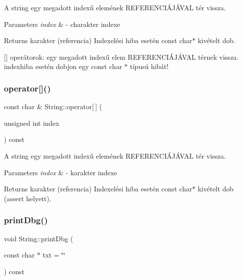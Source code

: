 A string egy megadott indexű elemének R\+E\+F\+E\+R\+E\+N\+C\+IÁ\+JÁ\+V\+AL tér vissza. 
\begin{DoxyParams}{Parameters}
{\em index} & -\/ charakter indexe \\
\hline
\end{DoxyParams}
\begin{DoxyReturn}{Returns}
karakter (referencia) Indexelési hiba esetén const char$\ast$ kivételt dob.
\end{DoxyReturn}
\mbox{[}\mbox{]} operátorok\+: egy megadott indexű elem R\+E\+F\+E\+R\+E\+N\+C\+IÁ\+JÁ\+V\+AL térnek vissza. indexhiba esetén dobjon egy const char $\ast$ típusú hibát! \mbox{\label{class_string_aa21521063bea848db1e3643f64d27887}} 
\subsubsection{\texorpdfstring{operator[]()}{operator[]()}\hspace{0.1cm}{\footnotesize\ttfamily [2/2]}}
{\footnotesize\ttfamily const char \& String\+::operator\mbox{[}$\,$\mbox{]} (\begin{DoxyParamCaption}\item[{unsigned int}]{index }\end{DoxyParamCaption}) const}

A string egy megadott indexű elemének R\+E\+F\+E\+R\+E\+N\+C\+IÁ\+JÁ\+V\+AL tér vissza. 
\begin{DoxyParams}{Parameters}
{\em index} & -\/ karakter indexe \\
\hline
\end{DoxyParams}
\begin{DoxyReturn}{Returns}
karakter (referencia) Indexelési hiba esetén const char$\ast$ kivételt dob (assert helyett). 
\end{DoxyReturn}
\mbox{\label{class_string_a2d2eef6db9c5a4e3fe4eda73b3ae2846}} 
\subsubsection{\texorpdfstring{printDbg()}{printDbg()}}
{\footnotesize\ttfamily void String\+::print\+Dbg (\begin{DoxyParamCaption}\item[{const char $\ast$}]{txt = {\ttfamily \char`\"{}\char`\"{}} }\end{DoxyParamCaption}) const\hspace{0.3cm}{\ttfamily [inline]}}

